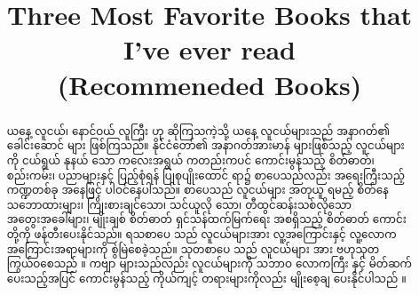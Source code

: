 \documentclass[conference]{IEEEtran}
\begin{document}
\title{Three Most Favorite Books that I've ever read\\(Recommeneded Books)}

\author{
}

\maketitle

\begin{abstract}
\setlength{\parskip}{6pt}
{\padauktext
ယနေ့ လူငယ်၊ နောင်ဝယ် လူကြီး ဟု ဆိုကြသကဲ့သို့ ယနေ့  လူငယ်များသည် အနာဂတ်၏ ခေါင်းဆောင် များ ဖြစ်ကြသည်။ နိုင်ငံတော်၏ အနာဂတ်အားမာန် များဖြစ်သည့် လူငယ်များကို ငယ်ရွယ် နုနယ် သော ကလေးအရွယ် ကတည်းကပင် ကောင်းမွန်သည့် စိတ်ဓာတ်၊ စည်းကမ်း၊ ပညာများနှင့် ပြည့်စုံရန် ပြုစုပျိုးထောင် ရာ၌ စာပေသည်လည်း အရေးကြီးသည့် ကဏ္ဍတစ်ခု အနေဖြင့် ပါဝင်နေပါသည်။ စာပေသည် လူငယ်များ အတုယူ ရမည့် စိတ်နေ သဘောထားများ၊ ကြိုးစားချင်သော၊ သင်ယူလို သော၊ တီထွင်ဆန်းသစ်လိုသော အတွေးအခေါ်များ၊ မျိုးချစ် စိတ်ဓာတ် ရှင်သန်ထက်မြက်ရေး အစရှိသည့် စိတ်ဓာတ် ကောင်းတို့ကို ဖန်တီးပေးနိုင်သည်။ ရသစာပေ သည် လူငယ်များအား လူ့အကြောင်းနှင့် လူ့လောက အကြောင်းအရာများကို စွဲမြဲစေခဲ့သည်။ သုတစာပေ သည် လူငယ်များ အား ဗဟုသုတ ကြွယ်ဝစေသည် ။ ကဗျာ များသည်လည်း လူငယ်များကို သဘာဝ လောကကြီး နှင့် မိတ်ဆက် ပေးသည့်အပြင် ကောင်းမွန်သည့် ကိုယ်ကျင့် တရားများကိုလည်း မျိုးစေ့ချ ပေးနိုင်ပါသည် ။} \end{abstract}

\begin{IEEEkeywords}
\end{IEEEkeywords}
\end{document}
